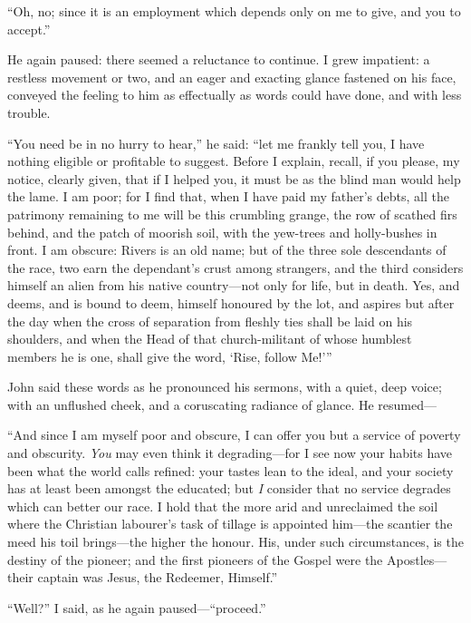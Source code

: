 \enquote{Oh, no; since it is an employment which depends only on me to
	give, and you to accept.}

He again paused: there seemed a reluctance to continue. I grew
impatient: a restless movement or two, and an eager and exacting glance
fastened on his face, conveyed the feeling to him as effectually as
words could have done, and with less trouble.

\enquote{You need be in no hurry to hear,} he said: \enquote{let me
	frankly tell you, I have nothing eligible or profitable to suggest.
	Before I explain, recall, if you please, my notice, clearly given, that
	if I helped you, it must be as the blind man would help the lame. I am
	poor; for I find that, when I have paid my father's debts, all the
	patrimony remaining to me will be this crumbling grange, the row of
	scathed firs behind, and the patch of moorish soil, with the yew-trees
	and holly-bushes in front. I am obscure: Rivers is an old name; but of
	the three sole descendants of the race, two earn the dependant's crust
	among strangers, and the third considers himself an alien from his
	native country---not only for life, but in death. Yes, and deems, and
	is bound to deem, himself honoured by the lot, and aspires but after the
	day when the cross of separation from fleshly ties shall be laid on his
	shoulders, and when the Head of that church-militant of whose humblest
	members he is one, shall give the word, \enquote{Rise, follow Me!}}

\St{} John said these words as he pronounced his sermons, with a quiet,
deep voice; with an unflushed cheek, and a coruscating radiance of
glance. He resumed---

\enquote{And since I am myself poor and obscure, I can offer you but a service
	of poverty and obscurity. \emph{You} may even think it degrading---for
	I see now your habits have been what the world calls refined: your
	tastes lean to the ideal, and your society has at least been amongst the
	educated; but \emph{I} consider that no service degrades which can
	better our race. I hold that the more arid and unreclaimed the soil
	where the Christian labourer's task of tillage is appointed him---the
	scantier the meed his toil brings---the higher the honour. His, under
	such circumstances, is the destiny of the pioneer; and the first
	pioneers of the Gospel were the Apostles---their captain was Jesus, the
	Redeemer, Himself.}

\enquote{Well?} I said, as he again paused---\enquote{proceed.}

